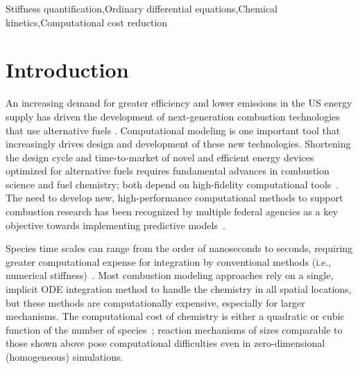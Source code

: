 \documentclass[12pt]{ussci}
\begin{document}
\begin{abstract}

\end{abstract}

\begin{keyword}
    Stiffness quantification\sep Ordinary differential equations\sep Chemical kinetics\sep Computational cost reduction
\end{keyword}

\section{Introduction}
%

An increasing demand for greater efficiency and lower  emissions in the US energy supply has driven the development of next-generation combustion technologies that use alternative fuels \cite{Epstein2012}.
Computational modeling is one important tool that increasingly drives design and development of these new technologies.
Shortening the design cycle and time-to-market of novel and efficient energy devices optimized for alternative fuels requires fundamental advances in combustion science and fuel chemistry; both depend on high-fidelity computational tools~\cite{Niemeyer}.
The need to develop new, high-performance computational methods to support combustion research has been recognized by multiple federal agencies as a key objective towards implementing predictive models~\cite{Trouve:2006tq,DOE:2007tj,NationalResearchCouncil:2011ub,National-Research-Council:2014aa}.

Species time scales can range from the order of nanoseconds to seconds, requiring greater computational expense for integration by conventional methods (i.e., numerical stiffness)~\cite{Lu2009}.
Most combustion modeling approaches rely on a single, implicit ODE integration method to handle the chemistry in all spatial locations, but these methods are computationally expensive, especially for larger mechanisms.
The computational cost of chemistry is either a quadratic or cubic function of the number of species~\cite{Lu2009}; reaction mechanisms of sizes comparable to those shown above pose computational difficulties even in zero-dimensional (homogeneous) simulations.
\end{document}
